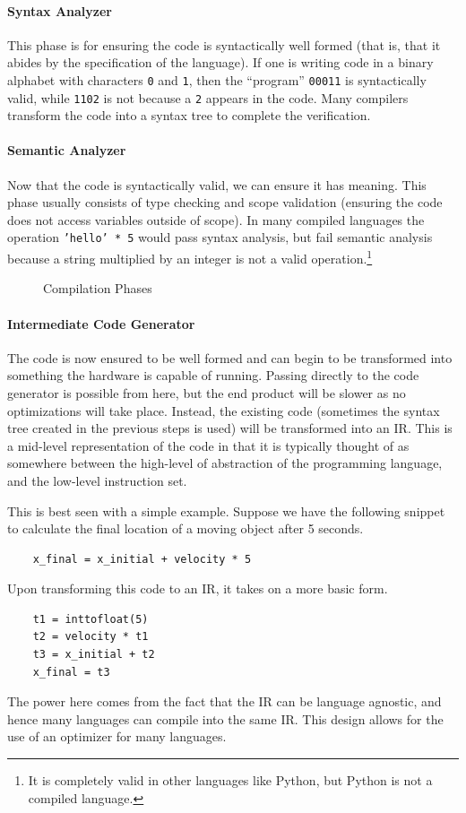 \paragraph{Syntax Analyzer}
This phase is for ensuring the code is syntactically well formed (that is, that it abides by the specification of the language).
If one is writing code in a binary alphabet with characters \texttt{0} and \texttt{1}, then the ``program'' \texttt{00011} is syntactically valid, while \texttt{1102} is not because a \texttt{2} appears in the code.
Many compilers transform the code into a syntax tree to complete the verification.

\paragraph{Semantic Analyzer}
Now that the code is syntactically valid, we can ensure it has meaning.
This phase usually consists of type checking and scope validation (ensuring the code does not access variables outside of scope).
In many compiled languages the operation \texttt{'hello' * 5} would pass syntax analysis, but fail semantic analysis because a string multiplied by an integer is not a valid operation.\footnote{It is completely valid in other languages like Python, but Python is not a compiled language.}

\begin{figure}
    \centering
    
    \caption{Compilation Phases}\label{fig:compilerphases} %
\end{figure}

\paragraph{Intermediate Code Generator}
The code is now ensured to be well formed and can begin to be transformed into something the hardware is capable of running.
Passing directly to the code generator is possible from here, but the end product will be slower as no optimizations will take place.
Instead, the existing code (sometimes the syntax tree created in the previous steps is used) will be transformed into an \acf{IR}.
This is a mid-level representation of the code in that it is typically thought of as somewhere between the high-level of abstraction of the programming language, and the low-level instruction set.

This is best seen with a simple example.
Suppose we have the following snippet to calculate the final location of a moving object after 5 seconds.
\begin{lstlisting}
    x_final = x_initial + velocity * 5
\end{lstlisting}
Upon transforming this code to an \ac{IR}, it takes on a more basic form.
\begin{lstlisting}
    t1 = inttofloat(5)
    t2 = velocity * t1
    t3 = x_initial + t2
    x_final = t3
\end{lstlisting}
The power here comes from the fact that the \acf{IR} can be language agnostic, and hence many languages can compile into the same \ac{IR}.
This design allows for the use of an optimizer for many languages.

